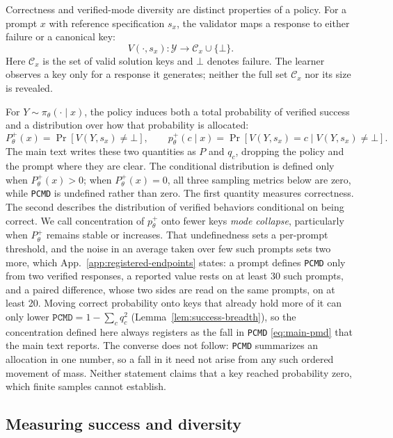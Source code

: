 \documentclass{article}
\newcommand{\1}{\mathbf 1}
\newcommand{\pmd}{\texttt{PCMD}}
\theoremstyle{remark}
\theoremstyle{definition}
\theoremstyle{plain}
\begin{document}
Correctness and verified-mode diversity are distinct properties of a policy. For a
prompt $x$ with reference specification $s_x$, the validator maps a response
to either failure or a canonical key:
\[
  V(\cdot,s_x):\mathcal Y\rightarrow \mathcal C_x\cup\{\bot\}.
\]
Here $\mathcal C_x$ is the set of valid solution keys and $\bot$ denotes
failure. The learner observes a key only for a response it generates; neither
the full set $\mathcal C_x$ nor its size is revealed.

For $Y\sim\pi_\theta(\cdot\mid x)$, the policy induces both a total probability
of verified success and a distribution over how that probability is allocated:
\[
 P_\theta^+(x)=\Pr[V(Y,s_x)\neq\bot],
 \qquad
 p_\theta^+(c\mid x)=\Pr[V(Y,s_x)=c\mid V(Y,s_x)\neq\bot].
\]
The main text writes these two quantities as $P$ and $q_c$, dropping the
policy and the prompt where they are clear.
The conditional distribution is defined only when $P_\theta^+(x)>0$;
when $P_\theta^+(x)=0$, all three sampling metrics below are zero, while
\pmd{} is undefined rather than zero.
The first quantity measures correctness. The second describes the distribution
of verified behaviors conditional on being correct. We call concentration of
$p_\theta^+$ onto fewer keys \emph{mode collapse}, particularly when
$P_\theta^+$ remains stable or increases. That undefinedness sets a per-prompt
threshold, and the noise in an average taken over few such prompts sets two
more, which
App.~\ref{app:registered-endpoints} states: a prompt defines \pmd{} only from
two verified responses, a reported value rests on at least 30 such prompts,
and a paired difference, whose two sides are read on the same prompts, on at
least 20.
Moving correct probability onto keys that already hold more of it can only
lower $\pmd{}=1-\sum_c q_c^2$ (Lemma~\ref{lem:success-breadth}), so the
concentration defined here always registers as the fall in \pmd{}
\eqref{eq:main-pmd} that the main text reports. The converse does not follow:
\pmd{} summarizes an allocation in one number, so a fall in it need not arise
from any such ordered movement of mass. Neither statement claims that a key
reached probability zero, which finite samples cannot establish.

\subsection{Measuring success and diversity}
\label{app:metric-sampling}
\end{document}
